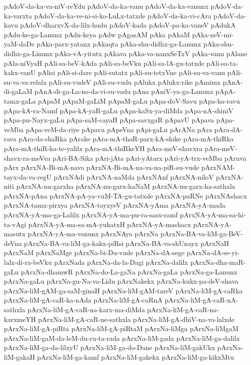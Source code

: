 {pAdoV-da-ka-va-niV-reYdu
pAdoV-da-ka-vanu
pAdoV-da-ka-vanunx
pAdoV-da-ka-varxta
pAdoV-da-ka-ve-ni-si-ko-LuLx-tatxde
pAdoV-da-ka-vi-cAra
pAdoV-da-kavu
pAdoV-dharxvX-da-lilx-hudu
pAdoV-kada
pAdoV-pa-ka-vaneV
pAdukA
pAdu-ke-ga-Lanunx
pAdu-keya
pAdw
pAgasAM
pAka
pAkaM
pAka-neV-mi-yaM-daDe
pAka-parx-yatanx
pAkaqta
pAka-shu-didhx-ga-Lanunx
pAka-shu-didhx-ga-Linunx
pAka-vA-yitutx
pAkava
pAka-va-nanxSeTxV
pAka-vanu
pAlane
pAla-niVyaH
pAli-sa-beV-kAda
pAli-sa-beVku
pAli-sa-lA-gu-tatxde
pAli-sa-ta-kakx-vanU
pAlisi
pAli-si-dare
pAli-sutatx
pAli-su-tetxVne
pAli-su-va-vanu
pAli-su-va-va-relalx
pAli-su-vudeV
pAli-su-vudu
pAlukx
pAlukx-rike
pAmimx
pAnA-di-gaLaM
pAnA-di-ga-La-no-da-vi-su-vadu
pAna
pAniV-ya-ga-Lanunx
pApA-tamx-gaLa
pApaM
pApaM-gaLiM
pApaM-gaLu
pApa-doV-Savu
pApa-ha-ravu
pApa-kA-ra-Namf
pApa-kA-yaR-gaLu
pApa-kaSx-ya-diMda
pApa-nA-shiniV
pApa-pu-Nayx-gaLu
pApa-saM-cayaH
pApa-savxgaR
pApavU
pApava
pApa-veMba
pApa-veM-da-riye
pApavu
pApeVna
pApi-gaLu
pArANa
pAra
pAra-dA-rava
pAra-da-shaRka
pArake
pAra-mA-thaR-parx-kA-shike
pAra-mA-thiRka
pAra-mA-thiR-ka-te-yalilx
pAra-mA-thiRkeYH
pAra-meV-shavxra
pAra-meV-shavx-ra-meVva
pAri-BA-Sika
pAri-jAta
pAri-yAtarx
pAri-yA-trx-veMba
pAruva
pArx
pArxNA-Bi-mA-nava
pArxNA-Bi-mA-na-va-na-piR-su-vude
pArxNAM-tayx-da-va-regU
pArxNAdi
pArxNA-naMda
pArxNAnf
pArxNA-niloV
pArxNA-niti
pArxNA-nu-garxha
pArxNA-nu-garx-haNaM
pArxNA-nu-garx-ha-sathxla
pArxNA-pAna
pArxNA-pA-ya-vuM-TA-gu-tatxde
pArxNA-paRNe
pArxNAshacx
pArxNA-tamx-pirxya
pArxNA-tayxyeV
pArxNA-yAma
pArxNA-yA-mada
pArxNA-yA-ma-ga-Lalilx
pArxNA-yA-ma-pu-ra-sasx-ramf
pArxNA-yA-ma-sa-hi-ta-vAgi
pArxNA-yA-ma-sa-mA-yukatxH
pArxNA-yA-mashacx
pArxNA-yA-masutx
pArxNA-yA-ma-vanunx
pArxNAya
pArxNa
pArxNa-BA-va-liM-ga-BeV-deVna
pArxNa-BA-va-liM-ga-kakx-piRsi
pArxNa-BA-va-shUnayx
pArxNaH
pArxNaM
pArxNaMge
pArxNa-bi-Du-vude
pArxNa-dA-sege
pArxNa-dA-se-yi-lalx-di-ra-beVku
pArxNada
pArxNa-da-la-Dagi
pArxNa-dalilx
pArxNa-dha-maR-gaLu
pArxNa-dhamwR
pArxNa-do-La-gaNa
pArxNa-gaLa
pArxNa-ga-Lanunx
pArxNa-gaLu
pArxNa-gu-Na-va-Lidu
pArxNakekx
pArxNa-kukx-pa-deV-shava
pArxNa-liM-gAM-ga-saM-ginaH
pArxNa-liM-gAM-tareV
pArxNa-liM-gA-caRka
pArxNa-liM-gA-caR-ka-nAda
pArxNa-liM-gA-caRnA
pArxNa-liM-gA-caR-nA-sathxla
pArxNa-liM-gA-caR-na-karx-ma-diMda
pArxNa-liM-gA-caR-na-karxmeYH
pArxNa-liM-gA-caR-ne-sathxla
pArxNa-liM-gA-dhiV-na-va-lalxde
pArxNa-liM-gA-piRta
pArxNa-liM-gA-piRtaM
pArxNa-liMga
pArxNa-liMgaM
pArxNa-liM-gaM-da-leM-du-ru-ta-rada
pArxNa-liM-gada
pArxNa-liM-ga-dalilx
pArxNa-liM-ga-da-lilxyU
pArxNa-liM-ga-do-Dane
pArxNa-liM-gakUkx
pArxNa-liM-gakaH
pArxNa-liM-ga-kamf
pArxNa-liM-gakekx
pArxNa-liM-ga-kikxMtu
}
